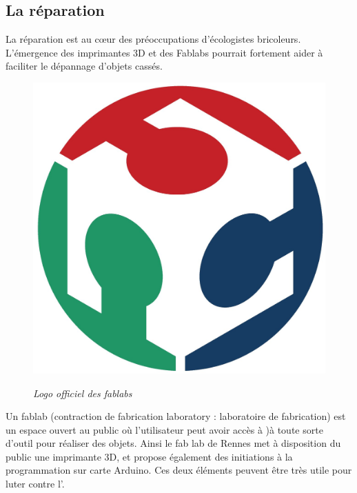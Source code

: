 \subsection{La réparation}
\label{ss::repartation}

La réparation est au cœur des préoccupations d'écologistes bricoleurs. L'émergence des imprimantes 3D et des Fablabs pourrait fortement aider  à faciliter le dépannage d'objets cassés. 

\begin{figure}\begin{center}
\vspace{-0.7cm}\includegraphics[scale=0.33]{Rsc/logofablab.jpg} 

\textit{Logo officiel des fablabs}
\end{center}
\end{figure}

Un fablab (contraction de fabrication laboratory : laboratoire de fabrication) est un espace ouvert au public où l'utilisateur peut avoir accès à )à toute sorte d'outil pour réaliser des objets. Ainsi le fab lab de Rennes met à disposition du public une imprimante 3D, et propose également des initiations à la programmation sur carte Arduino. 
Ces deux éléments peuvent être très utile pour luter contre l'\op. 

